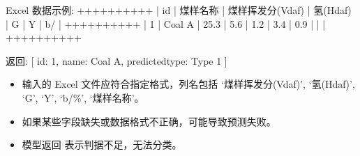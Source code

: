 \documentclass[a4paper,12pt,english]{sphinxmanual}
\begin{document}
\begin{fulllineitems}
\begin{description}
\begin{sphinxVerbatim}[commandchars=\\\{\}]
Excel 数据示例:
+\PYGZhy{}\PYGZhy{}\PYGZhy{}\PYGZhy{}+\PYGZhy{}\PYGZhy{}\PYGZhy{}\PYGZhy{}\PYGZhy{}\PYGZhy{}\PYGZhy{}\PYGZhy{}\PYGZhy{}\PYGZhy{}\PYGZhy{}\PYGZhy{}+\PYGZhy{}\PYGZhy{}\PYGZhy{}\PYGZhy{}\PYGZhy{}\PYGZhy{}\PYGZhy{}\PYGZhy{}\PYGZhy{}\PYGZhy{}+\PYGZhy{}\PYGZhy{}\PYGZhy{}\PYGZhy{}\PYGZhy{}+\PYGZhy{}\PYGZhy{}\PYGZhy{}\PYGZhy{}\PYGZhy{}+\PYGZhy{}\PYGZhy{}\PYGZhy{}\PYGZhy{}\PYGZhy{}+\PYGZhy{}\PYGZhy{}\PYGZhy{}\PYGZhy{}\PYGZhy{}+\PYGZhy{}\PYGZhy{}\PYGZhy{}\PYGZhy{}\PYGZhy{}+\PYGZhy{}\PYGZhy{}\PYGZhy{}\PYGZhy{}\PYGZhy{}+
| id | 煤样名称    | 煤样挥发分(Vdaf) | 氢(Hdaf) | G   | Y   | b/\PYGZpc{} |
+\PYGZhy{}\PYGZhy{}\PYGZhy{}\PYGZhy{}+\PYGZhy{}\PYGZhy{}\PYGZhy{}\PYGZhy{}\PYGZhy{}\PYGZhy{}\PYGZhy{}\PYGZhy{}\PYGZhy{}\PYGZhy{}\PYGZhy{}\PYGZhy{}+\PYGZhy{}\PYGZhy{}\PYGZhy{}\PYGZhy{}\PYGZhy{}\PYGZhy{}\PYGZhy{}\PYGZhy{}\PYGZhy{}\PYGZhy{}+\PYGZhy{}\PYGZhy{}\PYGZhy{}\PYGZhy{}\PYGZhy{}+\PYGZhy{}\PYGZhy{}\PYGZhy{}\PYGZhy{}\PYGZhy{}+\PYGZhy{}\PYGZhy{}\PYGZhy{}\PYGZhy{}\PYGZhy{}+\PYGZhy{}\PYGZhy{}\PYGZhy{}\PYGZhy{}\PYGZhy{}+\PYGZhy{}\PYGZhy{}\PYGZhy{}\PYGZhy{}\PYGZhy{}+\PYGZhy{}\PYGZhy{}\PYGZhy{}\PYGZhy{}\PYGZhy{}+
| 1  | Coal A     | 25.3     | 5.6 | 1.2 | 3.4 | 0.9 |     |     |
+\PYGZhy{}\PYGZhy{}\PYGZhy{}\PYGZhy{}+\PYGZhy{}\PYGZhy{}\PYGZhy{}\PYGZhy{}\PYGZhy{}\PYGZhy{}\PYGZhy{}\PYGZhy{}\PYGZhy{}\PYGZhy{}\PYGZhy{}\PYGZhy{}+\PYGZhy{}\PYGZhy{}\PYGZhy{}\PYGZhy{}\PYGZhy{}\PYGZhy{}\PYGZhy{}\PYGZhy{}\PYGZhy{}\PYGZhy{}+\PYGZhy{}\PYGZhy{}\PYGZhy{}\PYGZhy{}\PYGZhy{}+\PYGZhy{}\PYGZhy{}\PYGZhy{}\PYGZhy{}\PYGZhy{}+\PYGZhy{}\PYGZhy{}\PYGZhy{}\PYGZhy{}\PYGZhy{}+\PYGZhy{}\PYGZhy{}\PYGZhy{}\PYGZhy{}\PYGZhy{}+\PYGZhy{}\PYGZhy{}\PYGZhy{}\PYGZhy{}\PYGZhy{}+\PYGZhy{}\PYGZhy{}\PYGZhy{}\PYGZhy{}\PYGZhy{}+

返回:
[
    \PYGZob{}
        \PYGZdq{}id\PYGZdq{}: 1,
        \PYGZdq{}name\PYGZdq{}: \PYGZdq{}Coal A\PYGZdq{},
        \PYGZdq{}predicted\PYGZus{}type\PYGZdq{}: \PYGZdq{}Type 1\PYGZdq{}
    \PYGZcb{}
]
\end{sphinxVerbatim}

\begin{itemize}
\item {} 
\sphinxAtStartPar
输入的 Excel 文件应符合指定格式，列名包括 ‘煤样挥发分(Vdaf)’, ‘氢(Hdaf)’, ‘G’, ‘Y’, ‘b/\%’, ‘煤样名称’。

\item {} 
\sphinxAtStartPar
如果某些字段缺失或数据格式不正确，可能导致预测失败。

\item {} 
\sphinxAtStartPar
模型返回  表示判据不足，无法分类。

\end{itemize}

\end{description}

\end{fulllineitems}
\end{document}
